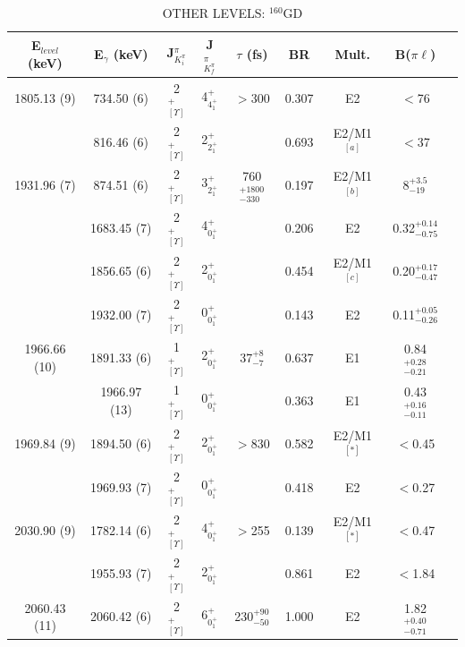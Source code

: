 \begin{table}[h!]
\begin{center}
\caption{OTHER LEVELS: $^{160}$GD \label{tab:160Gd_Kunknown}}

\begin{tabular}{ccccccccc}
E$_{level}$ (keV) & E$_\gamma$ (keV) & J$^\pi_{K^\pi_i}$ & J$^\pi_{K^\pi_f}$ & $\tau$ (fs) & BR & Mult. &  B($\pi\ell$) \\
\hline
\hline
1805.13 (9) & 734.50 (6)  & 2$^+_{[\Upsilon]}$ & 4$^+_{4^+_1}$ & $>$300   & 0.307 & E2                    & $<$76  \\
            & 816.46 (6)  & 2$^+_{[\Upsilon]}$ & 2$^+_{2^+_1}$ &          & 0.693 & E2/M1$^{[a]}$         & $<$37  \\\hline
1931.96 (7) &  874.51 (6) & 2$^+_{[\Upsilon]}$ & 3$^+_{2^+_1}$ & 760$^{+1800}_{-330}$  & 0.197 & E2/M1$^{[b]}$         & 8$^{+3.5}_{-19}$  \\
            & 1683.45 (7) & 2$^+_{[\Upsilon]}$ & 4$^+_{0^+_1}$ &                       & 0.206 & E2                    & 0.32$^{+0.14}_{-0.75}$  \\
            & 1856.65 (6) & 2$^+_{[\Upsilon]}$ & 2$^+_{0^+_1}$ &                       & 0.454 & E2/M1$^{[c]}$         & 0.20$^{+0.17}_{-0.47}$  \\
            & 1932.00 (7) & 2$^+_{[\Upsilon]}$ & 0$^+_{0^+_1}$ &                       & 0.143 & E2                    & 0.11$^{+0.05}_{-0.26}$  \\\hline
1966.66 (10)& 1891.33 (6) & 1$^+_{[\Upsilon]}$ & 2$^+_{0^+_1}$ & 37$^{+8}_{-7}$  & 0.637 & E1         & 0.84 $^{+0.28}_{-0.21}$  \\
            & 1966.97 (13)& 1$^+_{[\Upsilon]}$ & 0$^+_{0^+_1}$ &                 & 0.363 & E1         & 0.43 $^{+0.16}_{-0.11}$  \\\hline
1969.84 (9) & 1894.50 (6) & 2$^+_{[\Upsilon]}$ & 2$^+_{0^+_1}$ & $>$830   & 0.582 & E2/M1$^{[*]}$         & $<$0.45  \\
            & 1969.93 (7) & 2$^+_{[\Upsilon]}$ & 0$^+_{0^+_1}$ &          & 0.418 & E2                    & $<$0.27  \\\hline
2030.90 (9) & 1782.14 (6) & 2$^+_{[\Upsilon]}$ & 4$^+_{0^+_1}$ & $>$255   & 0.139 & E2/M1$^{[*]}$         & $<$0.47  \\
            & 1955.93 (7) & 2$^+_{[\Upsilon]}$ & 2$^+_{0^+_1}$ &          & 0.861 & E2                    & $<$1.84  \\\hline
2060.43 (11)& 2060.42 (6) & 2$^+_{[\Upsilon]}$ & 6$^+_{0^+_1}$ & 230$^{+90}_{-50}$  & 1.000 & E2         & 1.82 $^{+0.40}_{-0.71}$  \\\hline

\end{tabular}
\end{center}
\end{table}
